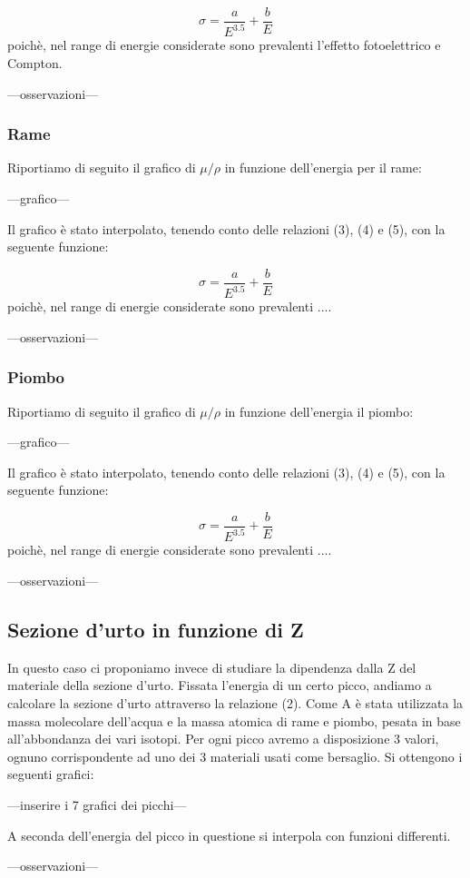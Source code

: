 \documentclass[a4paper,10pt]{article}
\begin{document}
\begin{equation}
	\sigma = \frac{a}{E^{3.5}} + \frac{b}{E}
\end{equation}
poichè, nel range di energie considerate sono prevalenti l'effetto fotoelettrico e Compton. 

---osservazioni---

\subsubsection{Rame}
Riportiamo di seguito il grafico di $\mu/\rho$ in funzione dell'energia per il rame:

---grafico---

Il grafico è stato interpolato, tenendo conto delle relazioni (3), (4) e (5), con la seguente funzione:

\begin{equation}
	\sigma = \frac{a}{E^{3.5}} + \frac{b}{E}
\end{equation}
poichè, nel range di energie considerate sono prevalenti .... 

---osservazioni---
\subsubsection{Piombo}
Riportiamo di seguito il grafico di $\mu/\rho$ in funzione dell'energia il piombo:

---grafico---

Il grafico è stato interpolato, tenendo conto delle relazioni (3), (4) e (5), con la seguente funzione:

\begin{equation}
	\sigma = \frac{a}{E^{3.5}} + \frac{b}{E}
\end{equation}
poichè, nel range di energie considerate sono prevalenti .... 

---osservazioni---

\subsection{Sezione d'urto in funzione di Z}
In questo caso ci proponiamo invece di studiare la dipendenza dalla Z del materiale della sezione d'urto. Fissata l'energia di un certo picco, andiamo a calcolare la sezione d'urto attraverso la relazione (2). Come A è stata utilizzata la massa molecolare dell'acqua e la massa atomica di rame e piombo, pesata in base all'abbondanza dei vari isotopi. Per ogni picco avremo a disposizione 3 valori, ognuno corrispondente ad uno dei 3 materiali usati come bersaglio. Si ottengono i seguenti grafici:

---inserire i 7 grafici dei picchi---

A seconda dell'energia del picco in questione si interpola con funzioni differenti.

---osservazioni---
\end{document}
